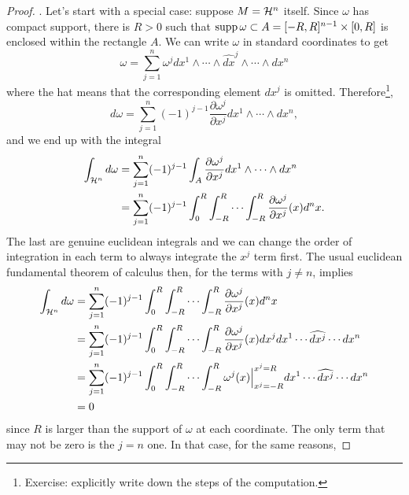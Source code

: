 \begin{proof}
  .
  Let's start with a special case: suppose $M = \mathcal{H}^n$ itself.
  Since $\omega$ has compact support, there is $R > 0$ such that $\operatorname{supp} \omega \subset A = [-R,R]^{n-1}\times[0,R]$ is enclosed within the rectangle $A$.
  We can write $\omega$ in standard coordinates to get
  \begin{equation}
    \omega = \sum_{j=1}^n \omega^j dx^1 \wedge \cdots\wedge \widehat{dx}^j \wedge \cdots\wedge dx^n
  \end{equation}
  where the hat means that the corresponding element $dx^j$ is omitted.
  Therefore\footnote{Exercise: explicitly write down the steps of the computation.},
  \begin{equation}
    d\omega = \sum_{j=1}^n (-1)^{j-1} \frac{\partial \omega^j}{\partial x^j}dx^1\wedge\cdots\wedge dx^n,
  \end{equation}
  and we end up with the integral
  \begin{align}
    \int_{\cH^n} d\omega
     & = \sum_{j=1}^n (-1)^{j-1} \int_A\frac{\partial \omega^j}{\partial x^j}dx^1\wedge\cdots\wedge dx^n                \\
     & = \sum_{j=1}^n (-1)^{j-1} \int_0^R\int_{-R}^R\cdots\int_{-R}^{R}\frac{\partial \omega^j}{\partial x^j}(x) d^n x. %
  \end{align}
  The last are genuine euclidean integrals and we can change the order of integration in each term to always integrate the $x^j$ term first.
  The usual euclidean fundamental theorem of calculus then, for the terms with $j\neq n$, implies
  \begin{align}
    \int_{\cH^n} d\omega
     & = \sum_{j=1}^n (-1)^{j-1} \int_0^R\int_{-R}^R\cdots\int_{-R}^{R}\frac{\partial \omega^j}{\partial x^j}(x) d^n x                                   \\ %
     & =\sum_{j=1}^n (-1)^{j-1} \int_0^R\int_{-R}^R\cdots\int_{-R}^{R}\frac{\partial \omega^j}{\partial x^j}(x) dx^j dx^1\cdots\widehat{dx^j}\cdots dx^n \\
     & =\sum_{j=1}^n (-1)^{j-1} \int_0^R\int_{-R}^R\cdots\int_{-R}^{R}\omega^j(x) \Big|_{x^j=-R}^{x^j=R} dx^1\cdots\widehat{dx^j}\cdots dx^n             \\
     & = 0
  \end{align}
  since $R$ is larger than the support of $\omega$ at each coordinate.
  The only term that may not be zero is the $j=n$ one.
  In that case, for the same reasons,

\end{proof}
